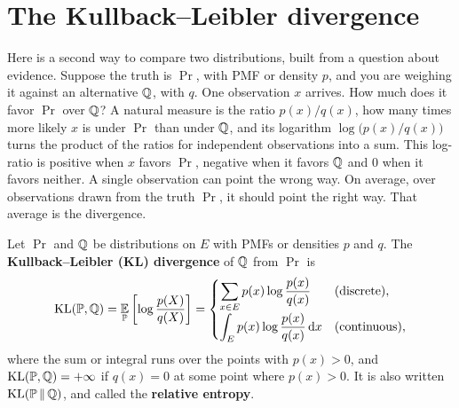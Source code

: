 \section{The Kullback--Leibler divergence}
\label{sec:dist-kl}

Here is a second way to compare two distributions, built from a question about evidence.
Suppose the truth is $\Pr$, with PMF or density $p$, and you are weighing it against an alternative $\mathbb{Q}$, with $q$.
One observation $x$ arrives.
How much does it favor $\Pr$ over $\mathbb{Q}$?
A natural measure is the ratio $p(x)/q(x)$, how many times more likely $x$ is under $\Pr$ than under $\mathbb{Q}$, and its logarithm $\log\big(p(x)/q(x)\big)$ turns the product of the ratios for independent observations into a sum.
This log-ratio is positive when $x$ favors $\Pr$, negative when it favors $\mathbb{Q}$ and $0$ when it favors neither.
A single observation can point the wrong way.
On average, over observations drawn from the truth $\Pr$, it should point the right way.
That average is the divergence.

\begin{definition}
\label{def:kl}
Let $\Pr$ and $\mathbb{Q}$ be distributions on $E$ with PMFs or densities $p$ and $q$.
The \textbf{Kullback--Leibler (KL) divergence} of $\mathbb{Q}$ from $\Pr$ is
\[
\mathrm{KL}(\mathbb{P}, \mathbb{Q}) = \operatorname*{\mathbb{E}}_{\mathbb{P}}\left[ \log \frac{p(X)}{q(X)} \right] =
\begin{cases}
\displaystyle \sum_{x \in E} p(x) \log \frac{p(x)}{q(x)} & \text{(discrete)},\\[10pt]
\displaystyle \int_E p(x) \log \frac{p(x)}{q(x)} \, \mathrm{d}x & \text{(continuous)},
\end{cases}
\]
where the sum or integral runs over the points with $p(x) > 0$, and $\mathrm{KL}(\mathbb{P}, \mathbb{Q}) = +\infty$ if $q(x) = 0$ at some point where $p(x) > 0$.
It is also written $\mathrm{KL}(\mathbb{P} \,\|\, \mathbb{Q})$, and called the \textbf{relative entropy}.
\end{definition}

